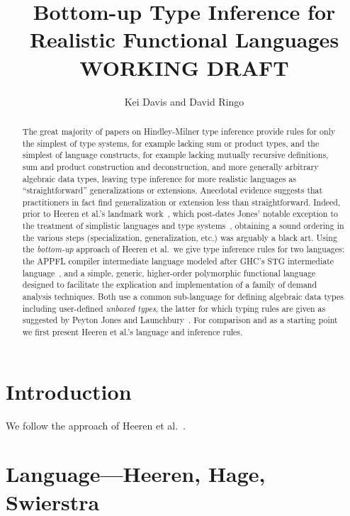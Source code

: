 \documentclass[11pt]{article}
\begin{document}

\title{Bottom-up Type Inference for Realistic Functional Languages\\ \Large{WORKING DRAFT}}
\author{Kei Davis and David Ringo}
\maketitle

\begin{abstract}
  The great majority of papers on Hindley-Milner type inference provide rules
  for only the simplest of type systems, for example lacking sum or product
  types, and the simplest of language constructs, for example lacking mutually
  recursive definitions, sum and product construction and deconstruction, and
  more generally arbitrary algebraic data types, leaving type inference for
  more realistic languages as ``straightforward'' generalizations or
  extensions.  Anecdotal evidence suggests that practitioners in fact find
  generalization or extension less than straightforward.  Indeed, prior to
  Heeren et al.'s landmark work~\cite{HHS02}, which post-dates Jones' notable
  exception to the treatment of simplistic languages and type
  systems~\cite{Jones2000}, obtaining a sound ordering in the various steps
  (specialization, generalization, etc.)  was arguably a black art.  Using the
  \emph{bottom-up} approach of Heeren et al.\ we give type inference rules for
  two languages: the APPFL compiler \cite{us} intermediate language modeled
  after GHC's STG intermediate language~\cite{PJ??}, and a simple, generic,
  higher-order polymorphic functional language designed to facilitate the
  explication and implementation of a family of demand analysis techniques.
  Both use a common sub-language for defining algebraic data types including
  user-defined \emph{unboxed types}, the latter for which typing rules are
  given as suggested by Peyton Jones and Launchbury~\cite{PJL??}.  For
  comparison and as a starting point we first present Heeren et al.'s language
  and inference rules.
\end{abstract}


\section{Introduction}
We follow the approach of Heeren et al.~\cite{HHS02}.

\section{Language---Heeren, Hage, Swierstra}
\end{document}
